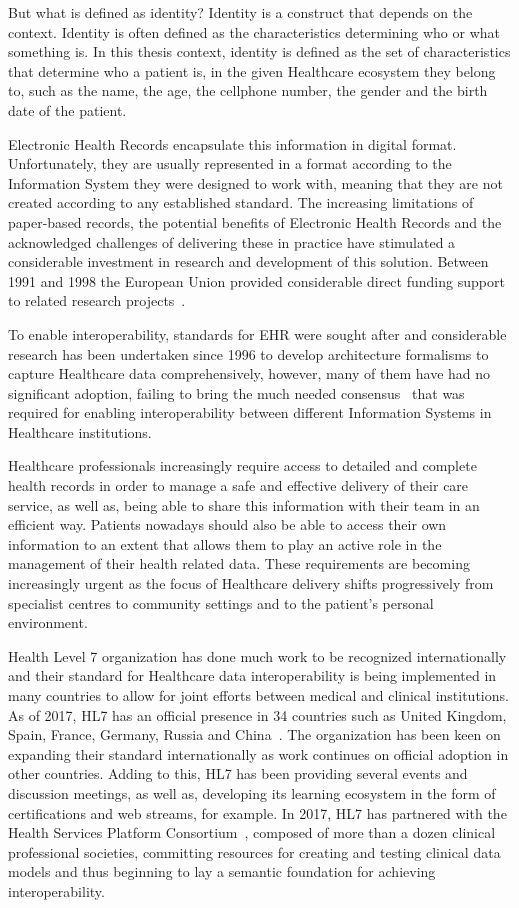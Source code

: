 But what is defined as identity? Identity is a construct that depends on the
context. Identity is often defined as the characteristics determining who or
what something is. In this thesis context, identity is defined as the set of
characteristics that determine who a patient is, in the given Healthcare
ecosystem they belong to, such as the name, the age, the cellphone number, the
gender and the birth date of the patient.  

Electronic Health Records encapsulate this information in digital format.
Unfortunately, they are usually represented in a format according to the
Information System they were designed to work with, meaning that they are not
created according to any established standard. The increasing limitations of
paper-based records, the potential benefits of Electronic Health Records and
the acknowledged challenges of delivering these in practice have stimulated a
considerable investment in research and development of this solution.  Between
1991 and 1998 the European Union provided considerable direct funding support
to related research projects~\cite{Kalra2006}.

To enable interoperability, standards for EHR were sought after and
considerable research has been undertaken since 1996 to develop architecture
formalisms to capture Healthcare data comprehensively, however, many of them
have had no significant adoption, failing to bring the much needed
consensus~\cite{Eichelberg2006} that was required for enabling interoperability
between different Information Systems in Healthcare institutions. 

Healthcare professionals increasingly require access to detailed and complete
health records in order to manage a safe and effective delivery of their care
service, as well as, being able to share this information with their team in an
efficient way. Patients nowadays should also be able to access their own
information to an extent that allows them to play an active role in the
management of their health related data. These requirements are becoming
increasingly urgent as the focus of Healthcare delivery shifts progressively
from specialist centres to community settings and to the patient’s personal
environment.

Health Level 7 organization has done much work to be recognized internationally
and their standard for Healthcare data interoperability is being implemented in
many countries to allow for joint efforts between medical and clinical
institutions.  As of 2017, HL7 has an official presence in 34 countries such as
United Kingdom, Spain, France, Germany, Russia and China~\cite{HL7Anual2016}.
The organization has been keen on expanding their standard internationally as
work continues on official adoption in other countries. Adding to this, HL7 has
been providing several events and discussion meetings, as well as, developing
its learning ecosystem in the form of certifications and web streams, for
example. In 2017, HL7 has partnered with the Health Services Platform
Consortium~\cite{hspcWebsite2018}, composed of more than a dozen clinical
professional societies, committing resources for creating and testing clinical
data models and thus beginning to lay a semantic foundation for achieving
interoperability.

